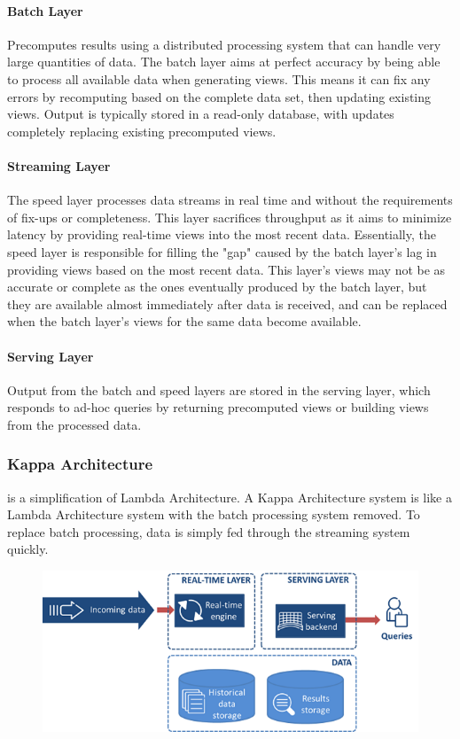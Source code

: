 \paragraph{Batch Layer}
\label{subsec:subsec01}
Precomputes results using a distributed processing system that can handle very large quantities of data. 
The batch layer aims at perfect accuracy by being able to process all available data when generating views. 
This means it can fix any errors by recomputing based on the complete data set, then updating existing views. 
Output is typically stored in a read-only database, with updates completely replacing existing precomputed views.
\paragraph{Streaming Layer}
\label{subsec:subsec01}
The speed layer processes data streams in real time and without the requirements of fix-ups or completeness. This layer sacrifices throughput as it aims 
to minimize latency by providing real-time views into the most recent data. Essentially, the speed layer is responsible for filling the "gap" caused by the 
batch layer's lag in providing views based on the most recent data. This layer's views may not be as accurate or complete as the ones eventually 
produced by the batch layer, but they are available almost immediately after data is received, and can be replaced when the batch layer's views for the 
same data become available.
\paragraph{Serving Layer}
\label{subsec:subsec01}
Output from the batch and speed layers are stored in the serving layer, which responds to ad-hoc queries by returning precomputed views or building views from the processed data.
\subsubsection{Kappa Architecture}
\label{subsec:subsec01}
is a simplification of Lambda Architecture. A Kappa Architecture system is like a Lambda Architecture system with the batch processing system removed. To replace batch processing, data is simply fed through the streaming system quickly.
\begin{figure}[h!]
	\centering
	\includegraphics[height=0.3\textheight]{fig01/kappa}
	\label{fig:FilialesEtClients}
\end{figure}

